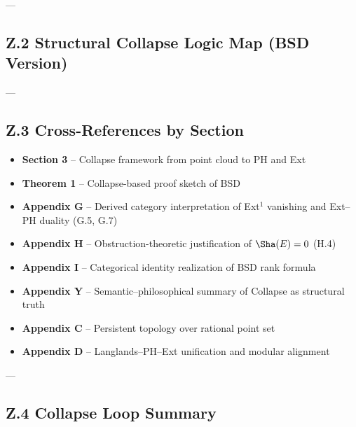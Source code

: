 ---

\subsection*{Z.2 Structural Collapse Logic Map (BSD Version)}

\begin{center}
\end{center}
---

\subsection*{Z.3 Cross-References by Section}

\begin{itemize}
  \item \textbf{Section 3} – Collapse framework from point cloud to PH and Ext
  \item \textbf{Theorem 1} – Collapse-based proof sketch of BSD
  \item \textbf{Appendix G} – Derived category interpretation of Ext$^1$ vanishing and Ext–PH duality (G.5, G.7)
  \item \textbf{Appendix H} – Obstruction-theoretic justification of \( \Sha(E) = 0 \) (H.4)
  \item \textbf{Appendix I} – Categorical identity realization of BSD rank formula
  \item \textbf{Appendix Y} – Semantic–philosophical summary of Collapse as structural truth
  \item \textbf{Appendix C} – Persistent topology over rational point set
  \item \textbf{Appendix D} – Langlands–PH–Ext unification and modular alignment
\end{itemize}

---

\subsection*{Z.4 Collapse Loop Summary}

